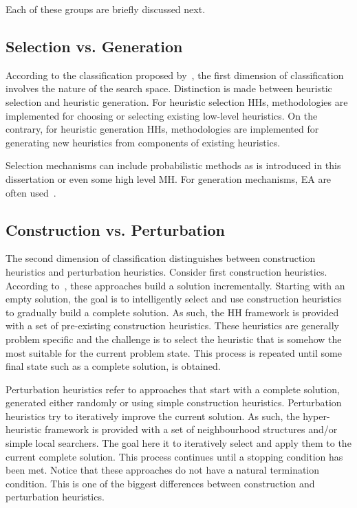 Each of these groups are briefly discussed next.

\subsection{Selection vs. Generation}

According to the classification proposed by~\cite{ref:burke:2010}, the first dimension of classification involves the nature of the search space. Distinction is made between heuristic selection and heuristic generation. For heuristic selection \acp{HH}, methodologies are implemented for choosing or selecting existing low-level heuristics. On the contrary, for heuristic generation \acp{HH}, methodologies  are implemented for generating new heuristics from components of existing heuristics.

Selection mechanisms can include probabilistic methods as is introduced in this dissertation or even some high level \ac{MH}. For generation mechanisms, \ac{EA} are often used~\cite{ref:burke:2010}.

\subsection{Construction vs. Perturbation}

The second dimension of classification distinguishes between construction heuristics and perturbation heuristics. Consider first construction heuristics. According to~\citeauthor{ref:burke:2010}\cite{ref:burke:2010}, these approaches build a solution incrementally. Starting with an empty solution, the goal is to intelligently select and use construction heuristics to gradually build a complete solution. As such, the \ac{HH} framework is provided with a set of pre-existing construction heuristics. These heuristics are generally problem specific and the challenge is to select the heuristic that is somehow the most suitable for the current problem state. This process is repeated until some final state such as a complete solution, is obtained.

Perturbation heuristics refer to approaches that start with a complete solution, generated either randomly or using simple construction heuristics.  Perturbation heuristics try to iteratively improve the current solution. As such, the hyper-heuristic framework is provided with a set of neighbourhood structures and/or simple local searchers. The goal here it to iteratively select and apply them to the current complete solution. This process continues until a stopping condition has been met. Notice that these approaches do not have a natural termination condition.
This is one of the biggest differences between construction and perturbation heuristics.

